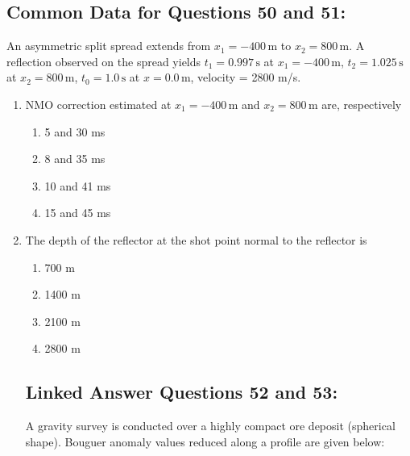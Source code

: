 \documentclass[journal,12pt,onecolumn]{IEEEtran}
\theoremstyle{remark}
\begin{document}
\subsection*{Common Data for Questions 50 and 51:}  
\vspace{0.5cm}
An asymmetric split spread extends from \(x_1 = -400\, \text{m}\) to \(x_2 = 800\, \text{m}\). A reflection observed on the spread yields  
\(t_1 = 0.997\, \text{s}\) at \(x_1 = -400\, \text{m}\),  
\(t_2 = 1.025\, \text{s}\) at \(x_2 = 800\, \text{m}\),  
\(t_0 = 1.0\, \text{s}\) at \(x = 0.0\, \text{m}\),  
velocity = 2800 m/s.
\vspace{0.5cm}
\begin{enumerate}[resume]

\item NMO correction estimated at \(x_1 = -400\, \text{m}\) and \(x_2 = 800\, \text{m}\) are, respectively  
\begin{multicols}{4}
\begin{enumerate}
\item 5 and 30 ms  
\item 8 and 35 ms  
\item 10 and 41 ms  
\item 15 and 45 ms  
\end{enumerate}
\end{multicols}

\item The depth of the reflector at the shot point normal to the reflector is  
\begin{multicols}{4}
\begin{enumerate}
\item 700 m  
\item 1400 m  
\item 2100 m  
\item 2800 m  
\end{enumerate}
\end{multicols}

\subsection*{Linked Answer Questions 52 and 53:} 
\vspace{0.5cm}
A gravity survey is conducted over a highly compact ore deposit (spherical shape). Bouguer anomaly values reduced along a profile are given below:




\end{enumerate}
\end{document}
